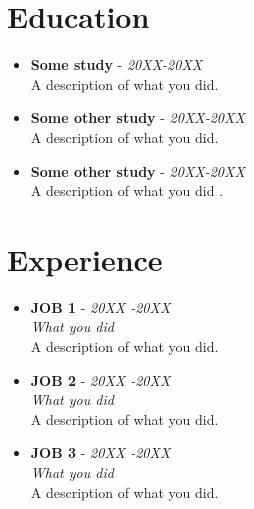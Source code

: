\documentclass[11pt, oneside, a4paper,titlepage]{article}
\begin{document}
\begin{tcolorbox}
\begin{minipage}[t]{8cm}
\begin{tcolorbox}[grow to left by=0.6cm,colback=Lblanco,colframe=Lblanco]
    \end{tcolorbox}
  \end{minipage}
  \begin{minipage}[t]{11cm}
     \vspace*{-0.5cm}
     \begin{tcolorbox}[grow to right by=0.6cm,colback=white,colframe=white]
      \section*{Education}
        \begin{itemize}
        \item{
            \textbf{Some study} -
            \emph{20XX-20XX} \\
             A description of what you did.
                      }
        \item{
            \textbf{Some other study} -
            \emph{20XX-20XX} \\
            A description of what you did. 
          }
        \item{
            \textbf{Some other study} -
            \emph{20XX-20XX} \\
            A description of what you did . 
          }

        \end{itemize}
      \section*{Experience}
       \begin{itemize}
        \item{
            \textbf{JOB 1} -
            \emph{20XX -20XX} \\
            \emph{What you did} \\
            A description of what you did.
                     }
        \item{
            \textbf{JOB 2} -
            \emph{20XX -20XX} \\
            \emph{What you did} \\
            A description of what you did.    
          }
         \item{
            \textbf{JOB 3} -
            \emph{20XX -20XX} \\
            \emph{What you did} \\
            A description of what you did.    
          }


\end{itemize}
\end{tcolorbox}
\end{minipage}
\end{tcolorbox}
\end{document}
